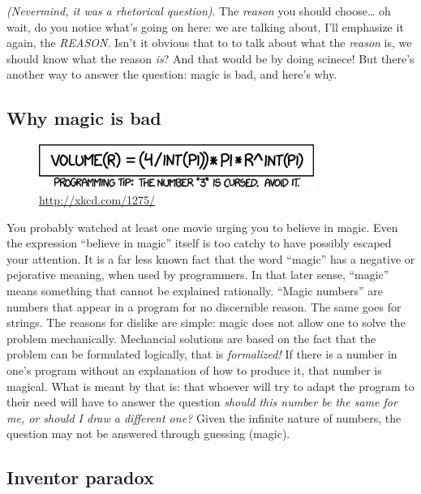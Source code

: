 \documentclass[11pt]{article}
\begin{document}
\emph{(Nevermind, it was a rhetorical question)}. The \emph{reason} you should choose\ldots{}
oh wait, do you notice what's going on here: we are talking about, I'll
emphasize it again, the \emph{REASON}.  Isn't it obvious that to to talk about
what the \emph{reason} is, we should know what the reason \emph{is}?  And that would
be by doing scinece!  But there's another way to answer the question:
magic is bad, and here's why.

\newpage
\subsection{Why magic is bad}
\label{sec-1-3}

\begin{figure}[h!]
  \centering
  \includegraphics[width=0.8\textwidth]{./int_pi.png}
  \caption[Cursed number 3]{
    \ssmall \url{http://xkcd.com/1275/}}
\end{figure}

You probably watched at least one movie urging you to believe in magic.  Even
the expression ``believe in magic'' itself is too catchy to have possibly
escaped your attention.  It is a far less known fact that the word ``magic''
has a negative or pejorative meaning, when used by programmers.  In that
later sense, ``magic'' means something that cannot be explained rationally.
``Magic numbers'' are numbers that appear in a program for no discernible
reason.  The same goes for strings.  The reasons for dislike are simple:
magic does not allow one to solve the problem mechanically.  Mechancial
solutions are based on the fact that the problem can be formulated logically,
that is \emph{formalized!} If there is a number in one's program without an
explanation of how to produce it, that number is magical.  What is meant by
that is: that whoever will try to adapt the program to their need will have
to answer the question \emph{should this number be the same for me, or should I
draw a different one?} Given the infinite nature of numbers, the question may
not be answered through guessing (magic).
\subsection{Inventor paradox}
\label{sec-1-4}
\end{document}
